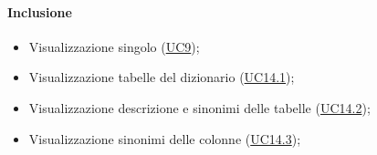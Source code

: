 \paragraph*{Inclusione}
\begin{itemize}
  \item Visualizzazione singolo  (\hyperref[UC9]{UC9});
  \item Visualizzazione tabelle del dizionario (\hyperref[UC14point1]{UC14.1});
  \item Visualizzazione descrizione e sinonimi delle tabelle (\hyperref[UC14point2]{UC14.2});
  \item Visualizzazione sinonimi delle colonne (\hyperref[UC14point3]{UC14.3});
\end{itemize}

